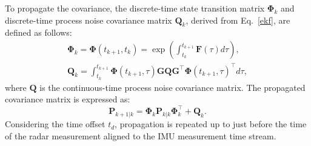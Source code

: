 To propagate the covariance, the discrete-time state transition matrix $\mathbf{\Phi}_k$ and discrete-time process noise covariance matrix $\mathbf{Q}_k$, derived from Eq.~\eqref{ekf}, are defined as follows:
\begin{equation}
    \begin{gathered}
        \mathbf{\Phi}_k = \mathbf{\Phi}(t_{k+1}, t_k) = \exp{\left( \int_{t_k}^{t_{k+1}} \mathbf{F}(\tau) d\tau \right)}, \\
        \mathbf{Q}_k = \int_{t_k}^{t_{k+1}} \mathbf{\Phi}(t_{k+1}, \tau) \mathbf{G}\mathbf{Q}\mathbf{G}^\top \mathbf{\Phi}(t_{k+1}, \tau)^\top d\tau,
    \end{gathered}
\end{equation}
where $\mathbf{Q}$ is the continuous-time process noise covariance matrix. The propagated covariance matrix is expressed as:
\begin{equation}
    \mathbf{P}_{k+1|k} = \mathbf{\Phi}_k \mathbf{P}_{k|k} \mathbf{\Phi}_k^\top + \mathbf{Q}_k.
\end{equation}
Considering the time offset \( t_d \), propagation is repeated up to just before the time of the radar measurement aligned to the IMU measurement time stream.